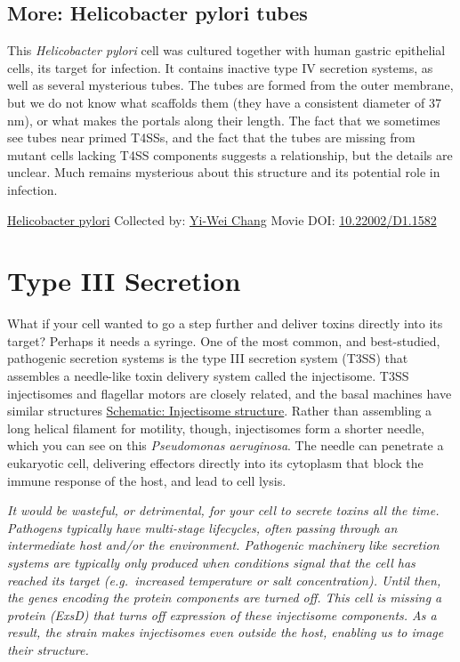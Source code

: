\documentclass[]{tufte-book}
\begin{document}
\hypertarget{Helicobacter_pylori_tubes}{%
\subsection*{More: Helicobacter pylori tubes}\label{Helicobacter_pylori_tubes}}

This \emph{Helicobacter pylori} cell was cultured together with human gastric epithelial cells, its target for infection. It contains inactive type IV secretion systems, as well as several mysterious tubes. The tubes are formed from the outer membrane, but we do not know what scaffolds them (they have a consistent diameter of 37 nm), or what makes the portals along their length. The fact that we sometimes see tubes near primed T4SSs, and the fact that the tubes are missing from mutant cells lacking T4SS components suggests a relationship, but the details are unclear. Much remains mysterious about this structure and its potential role in infection.



\hypertarget{htmlwidget-0fc42cc3757f99356ea4}{}

\label{fig:9-3a}\protect\hyperlink{tree}{Helicobacter pylori} Collected by: \protect\hyperlink{yi-wei_chang}{Yi-Wei Chang} Movie DOI: \href{https://doi.org/10.22002/D1.1582}{10.22002/D1.1582}

\hypertarget{type-iii-secretion}{%
\section{Type III Secretion}\label{type-iii-secretion}}

What if your cell wanted to go a step further and deliver toxins directly into its target? Perhaps it needs a syringe. One of the most common, and best-studied, pathogenic secretion systems is the type III secretion system (T3SS) that assembles a needle-like toxin delivery system called the injectisome. T3SS injectisomes and flagellar motors are closely related, and the basal machines have similar structures \protect\hyperlink{Injectisome_structure}{Schematic: Injectisome structure}. Rather than assembling a long helical filament for motility, though, injectisomes form a shorter needle, which you can see on this \emph{Pseudomonas aeruginosa}. The needle can penetrate a eukaryotic cell, delivering effectors directly into its cytoplasm that block the immune response of the host, and lead to cell lysis.

\emph{It would be wasteful, or detrimental, for your cell to secrete toxins all the time. Pathogens typically have multi-stage lifecycles, often passing through an intermediate host and/or the environment. Pathogenic machinery like secretion systems are typically only produced when conditions signal that the cell has reached its target (e.g.~increased temperature or salt concentration). Until then, the genes encoding the protein components are turned off. This cell is missing a protein (ExsD) that turns off expression of these injectisome components. As a result, the strain makes injectisomes even outside the host, enabling us to image their structure.}
\end{document}
